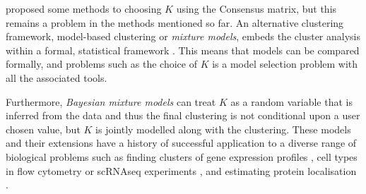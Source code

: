 \documentclass{bioinfo}
\begin{document}

\cite{monti2003consensus} proposed some methods to choosing $K$ using the Consensus matrix, but this remains a problem in the methods mentioned so far. An alternative clustering framework, model-based clustering or \emph{mixture models}, embeds the cluster analysis within a formal, statistical framework \citep{fraley2002model}. This means that models can be compared formally, and problems such as the choice of $K$ is a model selection problem with all the associated tools. 

Furthermore, \emph{Bayesian mixture models} can treat $K$ as a random variable that is inferred from the data and thus the final clustering is not conditional upon a user chosen value, but $K$ is jointly modelled along with the clustering. These models and their extensions have a history of successful application to a diverse range of biological problems such as finding clusters of gene expression profiles \citep{medvedovic2002bayesian}, cell types in flow cytometry \citep{chan2008statistical, hejblum2019sequential} or scRNAseq experiments \citep{prabhakaran2016dirichlet}, and estimating protein localisation \citep{crook2018bayesian}.
\end{document}
